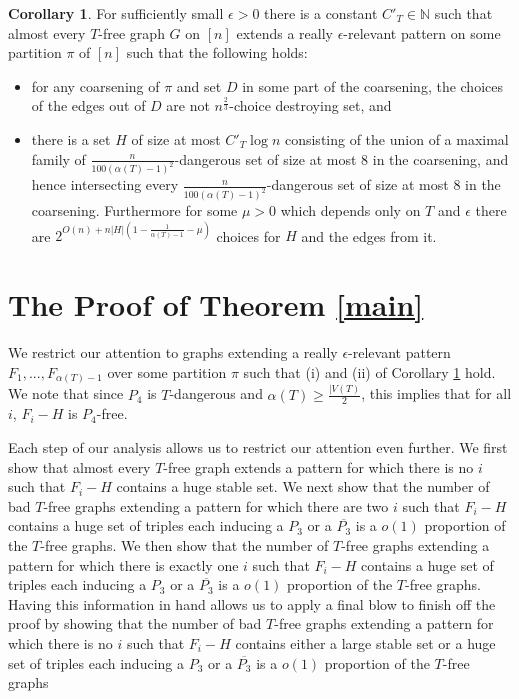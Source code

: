 \documentclass[12pt]{article}
\theoremstyle{definition}
\newtheorem{corollary}[theorem]{Corollary}
\begin{document}
\begin{corollary}\label{good}
For sufficiently small $\epsilon>0$ there is a constant $C'_T\in \mathbb{N}$ such that almost every $T$-free graph $G$ on $[n]$ extends a really $\epsilon$-relevant  pattern on some partition $\pi$ of $[n]$ such that the following holds: 
\begin{itemize}
\item [(i)]  for  any coarsening of  $\pi$ and set $D$ in some part of the coarsening,  the choices of the edges out of $D$ are not  $n^\frac{2}{3}$-choice destroying set,  and
\item [(ii)] there is a set $H$ of size  at most $C'_T \log n$ consisting of the union of   a maximal family of   $\frac{n}{100(\alpha(T)-1)^2}$-dangerous set 
of size at most 8 in the coarsening, and hence intersecting  every $\frac{n}{100(\alpha(T)-1)^2}$-dangerous set  of size at most 8 in the coarsening. Furthermore for some 
$\mu>0$ which depends only on $T$ and $\epsilon$ there are $2^{O(n)+n|H|(1-\frac{1}{\alpha(T)-1}-\mu)}$ choices for $H$ and the edges from it. 
\end{itemize}
\end{corollary}


\section{The Proof of Theorem \ref{main}}\label{betterapprox}

We restrict our attention to graphs extending a really $\epsilon$-relevant pattern $F_1,...,F_{\alpha(T)-1}$  over some partition $\pi$ such that (i) and (ii) of Corollary  \ref{good}  hold. We note that since $P_4$ is $T$-dangerous 
and $\alpha(T)\ge \frac{|V(T)}{2}$, 
this implies that for all $i$, $F_i-H$ is $P_4$-free. 


Each step of our analysis allows us to restrict our  attention even further. 
We first show that almost every $T$-free graph extends a pattern for which there is no $i$   such that $F_i-H$ contains a huge stable set.
We next show that the number of  bad $T$-free graphs extending a pattern for which there are  two $i$   such that $F_i-H$ contains a huge set of triples each inducing a $P_3$ 
or a $\overline{P_3}$  is a $o(1)$ proportion of the $T$-free graphs. 
We then show that the number of  $T$-free graphs extending a pattern for which there is exactly one  $i$   such that $F_i-H$ contains a huge set of triples each inducing a $P_3$ 
or a $\overline{P_3}$ is a $o(1)$ proportion of the $T$-free graphs. Having this information in hand allows us to apply a final blow to finish off the proof by showing that the number of bad $T$-free graphs extending a pattern for which there is no  $i$   such that $F_i-H$ contains either a large stable set or a huge set of triples each inducing a $P_3$ 
or a $\overline{P_3}$ is a $o(1)$ proportion of the $T$-free graphs
\end{document}

